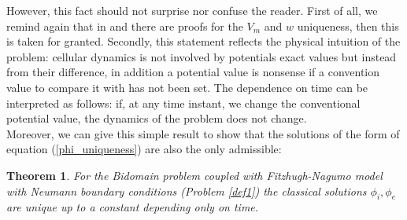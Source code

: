\documentclass[a4paper,11pt]{article}
\newtheorem{theo}{Theorem}
\begin{document}
\vspace{4mm}
\noindent However, this fact should not surprise nor confuse the reader. First of all, we remind again that in \cite{bourgault} and \cite{colli_franzone} there are proofs for the $V_m$ and $w$ uniqueness, then this is taken for granted. Secondly, this statement reflects the physical intuition of the problem: cellular dynamics is not involved by potentials exact values but instead from their difference, in addition a potential value is nonsense if a convention value to compare it with has not been set. The dependence on time can be interpreted as follows: if, at any time instant, we change the conventional potential value, the dynamics of the problem does not change. \\

\noindent Moreover, we can give this simple result to show that the solutions of the form of equation (\ref{phi_uniqueness}) are also the only admissible:\\
\begin{theo}
	For the Bidomain problem coupled with Fitzhugh-Nagumo model with Neumann boundary conditions (Problem \ref{def1}) the classical solutions $\phi_i,\phi_e$ are unique up to a constant depending only on time. 
\end{theo}
\end{document}

